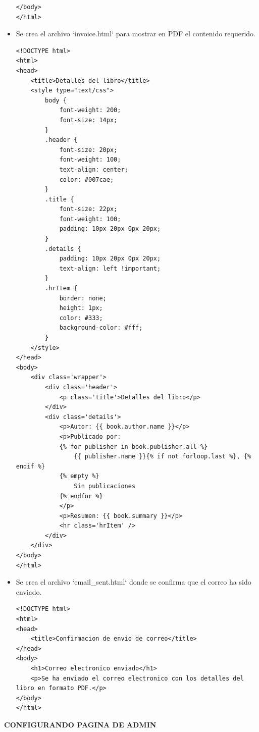 \documentclass{article}
\begin{document}
\begin{itemize}
\begin{lstlisting}[style=html]
</body>
</html>
\end{lstlisting}

\item Se crea el archivo `invoice.html` para mostrar en PDF el contenido requerido.

\begin{lstlisting}[style=html]
<!DOCTYPE html>
<html>
<head>
    <title>Detalles del libro</title>
    <style type="text/css">
        body {
            font-weight: 200;
            font-size: 14px;
        }
        .header {
            font-size: 20px;
            font-weight: 100;
            text-align: center;
            color: #007cae;
        }
        .title {
            font-size: 22px;
            font-weight: 100;
            padding: 10px 20px 0px 20px;  
        }
        .details {
            padding: 10px 20px 0px 20px;
            text-align: left !important;
        }
        .hrItem {
            border: none;
            height: 1px;
            color: #333;
            background-color: #fff;
        }
    </style>
</head>
<body>
    <div class='wrapper'>
        <div class='header'>
            <p class='title'>Detalles del libro</p>
        </div>
        <div class='details'>
            <p>Autor: {{ book.author.name }}</p>
            <p>Publicado por: 
            {% for publisher in book.publisher.all %}
                {{ publisher.name }}{% if not forloop.last %}, {% endif %}
            {% empty %}
                Sin publicaciones
            {% endfor %}
            </p>
            <p>Resumen: {{ book.summary }}</p>
            <hr class='hrItem' />
        </div>
    </div>
</body>
</html>
\end{lstlisting}

\item Se crea el archivo `email\_sent.html` donde se confirma que el correo ha sido enviado.

\begin{lstlisting}[style=html]
<!DOCTYPE html>
<html>
<head>
    <title>Confirmacion de envio de correo</title>
</head>
<body>
    <h1>Correo electronico enviado</h1>
    <p>Se ha enviado el correo electronico con los detalles del libro en formato PDF.</p>
</body>
</html>
\end{lstlisting}

\end{itemize}


\vspace{2\baselineskip}

\textbf{CONFIGURANDO PAGINA DE ADMIN}
\end{document}
